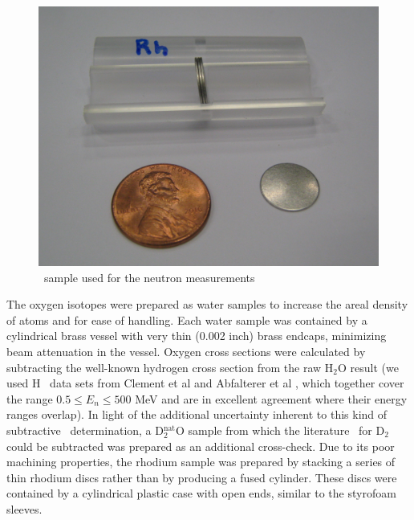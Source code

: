 \begin{figure}
    \includegraphics[scale=0.25]{figures/RhodiumSample.jpg}
    \caption{\rhThree\ sample used for the neutron \tot measurements}
    \label{SamplesImage}
\end{figure}


The oxygen isotopes were prepared as water samples to increase the areal density
of atoms and for ease of handling. Each water sample was contained by a
cylindrical brass vessel with very thin (0.002 inch) brass endcaps, minimizing
beam attenuation in the vessel. Oxygen cross sections were calculated by
subtracting the well-known hydrogen cross section from the raw H$_{2}$O result
(we used H \tot\ data sets from Clement et al \cite{Clement1972} and Abfalterer
et al \cite{Abfalterer2001}, which together cover the range $0.5 \leq E_n \leq 500$ MeV
and are in excellent agreement where their energy ranges overlap). In light of
the additional uncertainty inherent to this kind of subtractive \tot\
determination, a D$_{2}^{\text{nat}}$O sample from which the literature \tot\ for
D$_{2}$ could be subtracted was prepared as an additional cross-check. Due to its poor 
machining properties, the rhodium
sample was prepared by stacking a series of thin rhodium discs rather than by
producing a fused cylinder. These discs were contained by a cylindrical plastic
case with open ends, similar to the styrofoam sleeves.

